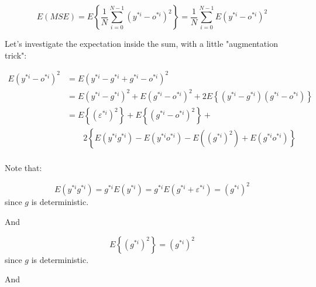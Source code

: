 \documentclass[runningheads,openany]{xhlPaper}
\begin{document}

\begin{displaymath}
E\left ( MSE \right )=E\left \{ \frac{1}{N} {\sum_{i=0}^{N-1}\left ( y^{*i}-o^{*i} \right )^2}\right \}
=\frac{1}{N}{\sum_{i=0}^{N-1}{E\left ( y^{*i}-o^{*i} \right )^2}}
\end{displaymath}

Let's investigate the expectation inside the sum, with a little "augmentation trick":

\begin{displaymath}
\begin{aligned}
E\left ( y^{*i}-o^{*i} \right )^2&=E\left ( y^{*i}-g^{*i}+g^{*i}-o^{*i} \right )^2\\
&=E\left ( y^{*i}-g^{*i} \right )^2+E\left ( g^{*i}-o^{*i} \right )^2+2E\left \{ \left ( y^{*i}-g^{*i} \right )\left ( g^{*i}-o^{*i} \right )\right \}\\
&=E\left \{ \left(\varepsilon^{*i}\right)^2  \right \}+E\left \{\left ( g^{*i}-o^{*i} \right )^2\right \}+\\
&\quad\quad 2\left \{ E\left ( y^{*i}g^{*i} \right ) -E\left ( y^{*i}o^{*i} \right )-E\left ( \left ( g^{*i} \right )^2 \right ) +E\left ( g^{*i}o^{*i} \right )\right \}
\\
\end{aligned}
\end{displaymath}

Note that:

\begin{displaymath}
E\left ( y^{*i}g^{*i} \right )=g^{*i}E\left ( y^{*i} \right )=g^{*i}E\left ( g^{*i}+\varepsilon^{*i}  \right )=\left ( g^{*i} \right )^2
\end{displaymath}
since $g$ is deterministic.

And

\begin{displaymath}
E\left \{ \left ( g^{*i} \right )^2 \right \}=\left ( g^{*i} \right )^2
\end{displaymath}
since $g$ is deterministic.

And
\end{document}
